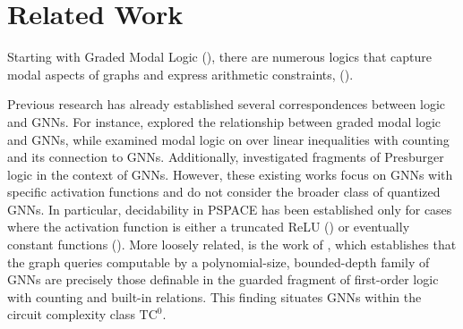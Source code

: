 \section{Related Work}
\label{sec:relatedwork}
Starting with Graded Modal Logic  (\cite{DBLP:journals/ndjfl/Fine72}),
there are numerous logics that capture modal aspects of graphs and express arithmetic constraints, (\cite{
DBLP:journals/japll/DemriL10,
DBLP:conf/frocos/BaaderB19,
DBLP:conf/fsttcs/BednarczykOPT21,
DBLP:conf/kr/GallianiKT23,
DBLP:journals/bsl/BenthemI23}). 

Previous research has already established several correspondences between logic and GNNs. For instance, \citet{DBLP:conf/iclr/BarceloKM0RS20} explored the relationship between graded modal logic and GNNs, while \citet{ijcai2024} examined modal logic on over linear inequalities with counting and its connection to GNNs. Additionally, \citet{benedikt2024decidability} investigated fragments of Presburger logic in the context of GNNs. However, these existing works focus on GNNs with specific activation functions and do not consider the broader class of quantized GNNs. In particular, decidability in PSPACE has been established only for cases where the activation function is either a truncated ReLU (\cite{ijcai2024}) or eventually constant functions (\cite{benedikt2024decidability}). 
More loosely related, is the work of \citet{Grohe23}, which establishes that the graph queries computable by a polynomial-size, bounded-depth family of GNNs are precisely those definable in the guarded fragment    of first-order logic with counting and built-in relations. This finding situates GNNs within the circuit complexity class  $\text{TC}^0$.


